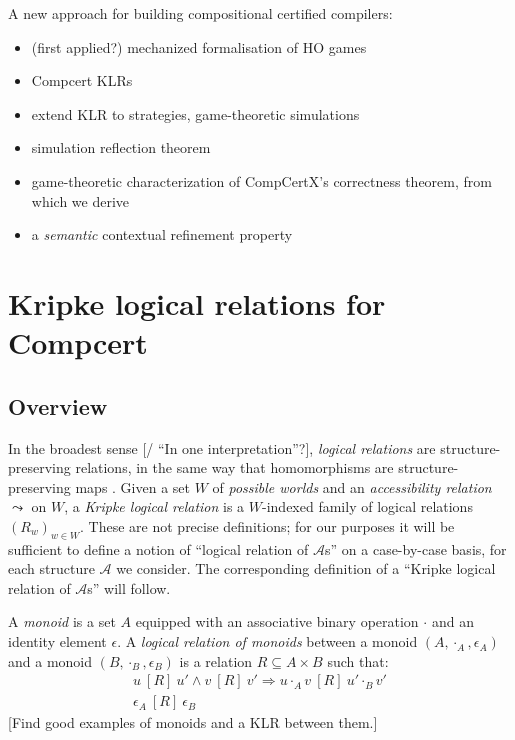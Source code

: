 \documentclass[acmsmall,anonymous]{acmart}
\newcommand{\ifr}[1]{\ [{#1}]\ }
\begin{document}
A new approach for building compositional certified compilers:
\begin{itemize}
\item (first applied?) mechanized formalisation of HO games
\item Compcert KLRs
\item extend KLR to strategies, game-theoretic simulations
\item simulation reflection theorem
\item game-theoretic characterization of CompCertX's correctness theorem, from which we derive
\item a \emph{semantic} contextual refinement property
\end{itemize}


\newpage
\section{Kripke logical relations for Compcert} %


\subsection{Overview} %

In the broadest sense [/ ``In one interpretation''?],
\emph{logical relations} are structure-preserving relations,
in the same way that homomorphisms are structure-preserving maps
\citep{lrp}.
Given a set $W$ of \emph{possible worlds}
and an \emph{accessibility relation} $\leadsto$ on $W$,
a \emph{Kripke logical relation} is
a $W$-indexed family of logical relations $(R_w)_{w \in W}$.
These are not precise definitions;
for our purposes it will be sufficient
to define a notion of ``logical relation of $\mathcal{A}$s''
on a case-by-case basis,
for each structure $\mathcal{A}$ we consider.
The corresponding definition of a
``Kripke logical relation of $\mathcal{A}$s''
will follow.

\begin{example}
A \emph{monoid} is a set $A$ equipped with
an associative binary operation $\cdot$ and
an identity element $\epsilon$.
A \emph{logical relation of monoids} between
a monoid $(A, \cdot_A, \epsilon_A)$ and
a monoid $(B, \cdot_B, \epsilon_B)$
is a relation $R \subseteq A \times B$
such that:
\begin{gather*}
u \ifr{R} u' \wedge v \ifr{R} v' \Rightarrow u \cdot_A v \ifr{R} u' \cdot_B v' \\
\epsilon_A \ifr{R} \epsilon_B
\end{gather*}
[Find good examples of monoids and a KLR between them.]
\end{example}
\end{document}

